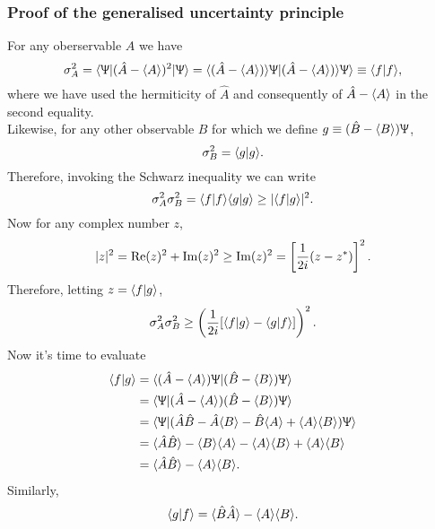 \subsubsection{Proof of the generalised uncertainty principle}
For any oberservable $A$ we have
\begin{equation}
\label{uncert_sigma}
\sigma_A^2=\langle \Uppsi|(\hat{A}- \langle A\rangle )^2|\Uppsi\rangle =\langle(\hat{A}-\langle A\rangle) \rangle\Uppsi|(\hat{A}-\langle A\rangle) \rangle\Uppsi\rangle\equiv \langle f|f\rangle, 
\end{equation}
where we have used the hermiticity of $\hat{A}$ and consequently of $\hat{A}- \langle A\rangle $ in the second equality. \\
Likewise, for any other observable $B$ for which we define $g\equiv (\hat{B}- \langle B\rangle)\Uppsi $, 
\begin{equation}
\sigma_B^2=\langle g|g\rangle.
\end{equation}
Therefore, invoking the Schwarz inequality we can write 
\begin{equation}
\sigma_A^2\sigma_B^2=\langle f|f\rangle \langle g|g\rangle\geq| \langle f|g\rangle|^2.
\end{equation}
Now for any complex number $z$,
\begin{equation}
\label{uncert_z}
|z|^2=\operatorname{Re}(z)^2+\operatorname{Im}(z)^2\geq\operatorname{Im}(z)^2=\left[\frac{1}{2i}(z-z^*) \right]^2.
\end{equation}
Therefore, letting $z=\langle f|g\rangle $,
\begin{equation}
\sigma_A^2\sigma_B^2\geq \left(\frac{1}{2i}[\langle f|g\rangle- \langle g|f\rangle ] \right)^2.
\end{equation}
Now it's time to evaluate
\begin{subequations}
\begin{align}
\langle f|g\rangle&=\langle (\hat{A}- \langle A\rangle)\Uppsi |(\hat{B}- \langle B\rangle)\Uppsi\rangle\\
&=\langle \Uppsi |(\hat{A}- \langle A\rangle)(\hat{B}- \langle B\rangle)\Uppsi\rangle\\
&=\langle \Uppsi|(\hat{A}\hat{B}-\hat{A}\langle B\rangle-\hat{B}\langle A\rangle+\langle A\rangle \langle B\rangle ) \Uppsi\rangle\\
&=\langle \hat{A}\hat{B}\rangle- \langle B\rangle \langle A\rangle- \langle A\rangle \langle B\rangle+\langle A\rangle \langle B\rangle\\
&=\langle \hat{A}\hat{B}\rangle-\langle A\rangle \langle B\rangle.
\end{align}
\end{subequations}
Similarly,
\begin{equation}
\langle g|f\rangle=\langle \hat{B}\hat{A}\rangle-\langle A\rangle \langle B\rangle.
\end{equation}
